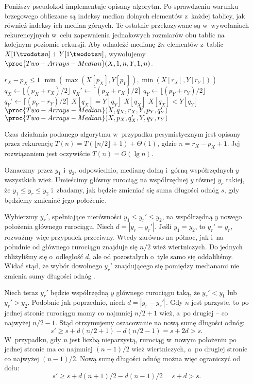 Poniższy pseudokod implementuje opisany algorytm.
Po sprawdzeniu warunku brzegowego obliczane są indeksy median dolnych elementów z~każdej tablicy, jak również indeksy ich median górnych.
Te ostatnie przekazywane są w~wywołaniach rekurencyjnych w~celu zapewnienia jednakowych rozmiarów obu tablic na kolejnym poziomie rekursji.
Aby odnaleźć medianę $2n$ elementów z~tablic $X[1\twodots n]$ i~$Y[1\twodots n]$, wywołujemy $\proc{Two-Arrays-Median}(X,1,n,Y,1,n)$.

\begin{codebox}
\li	\If $r_X-p_X\le1$
\li		\Then \Return $\min(\max(X[p_X],Y[p_Y]),\min(X[r_X],Y[r_Y]))$
		\End
\li	$q_X\gets\lfloor(p_X+r_X)/2\rfloor$
\li	$q_X'\gets\lceil(p_X+r_X)/2\rceil$
\li	$q_Y\gets\lfloor(p_Y+r_Y)/2\rfloor$
\li	$q_Y'\gets\lceil(p_Y+r_Y)/2\rceil$
\li	\If $X[q_X]=Y[q_Y]$
\li		\Then \Return $X[q_X]$
		\End
\li	\If $X[q_X]<Y[q_Y]$
\li		\Then \Return $\proc{Two-Arrays-Median}(X,q_X,r_X,Y,p_Y,q_Y')$
\li		\Else \Return $\proc{Two-Arrays-Median}(X,p_X,q_X',Y,q_Y,r_Y)$
		\End
\end{codebox}

Czas działania podanego algorytmu w~przypadku pesymistycznym jest opisany przez rekurencję $T(n)=T(\lfloor n/2\rfloor+1)+\Theta(1)$, gdzie $n=r_X-p_X+1$.
Jej rozwiązaniem jest oczywiście $T(n)=O(\lg n)$.

\exercise %
Oznaczmy przez $y_1$ i~$y_2$, odpowiednio, medianę dolną i~górną współrzędnych $y$ wszystkich wież.
Umieścimy główny rurociąg na współrzędnej $y$ równej $y_r$ takiej, że $y_1\le y_r\le y_2$ i~zbadamy, jak będzie zmieniać się suma długości odnóg  $s$, gdy będziemy zmieniać jego położenie.

Wybierzmy $y_r'$, spełniające nierówności $y_1\le y_r'\le y_2$, na współrzędną $y$ nowego położenia głównego rurociągu.
Niech $d=|y_r-y_r'|$.
Jeśli $y_1=y_2$, to $y_r'=y_r$, rozważmy więc przypadek przeciwny.
Wtedy zarówno na północ, jak i~na południe od głównego rurociągu znajduje się $n/2$ wież wiertniczych.
Do jednych zbliżyliśmy się o~odległość $d$, ale od pozostałych o~tyle samo się oddaliliśmy.
Widać stąd, że wybór dowolnego $y_r'$ znajdującego się pomiędzy medianami nie zmienia sumy długości odnóg .

Niech teraz $y_r'$ będzie współrzędną $y$ głównego rurociągu taką, że $y_r'<y_1$ lub $y_r'>y_2$.
Podobnie jak poprzednio, niech $d=|y_r-y_r'|$.
Gdy $n$ jest parzyste, to po jednej stronie rurociągu mamy co najmniej $n/2+1$ wież, a~po drugiej -- co najwyżej $n/2-1$.
Stąd otrzymujemy oszacowanie na nową sumę długości odnóg:
\[
    s' \ge s+d(n/2+1)-d(n/2-1) = s+2d > s.
\]
W~przypadku, gdy $n$ jest liczbą nieparzystą, rurociąg w~nowym położeniu po jednej stronie ma co najmniej $(n+1)/2$ wież wiertniczych, a~po drugiej stronie co najwyżej $(n-1)/2$.
Nową sumę długości odnóg można więc ograniczyć od dołu:
\[
    s' \ge s+d(n+1)/2-d(n-1)/2 = s+d > s.
\]

